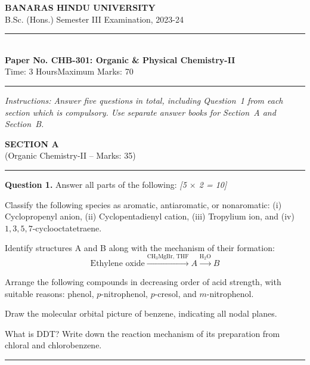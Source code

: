 \documentclass[11pt,a4paper]{article}
\newcommand{\pts}[1]{\hfill   \textit{[#1]}}
\begin{document}
\begin{center}
  {\large\bfseries BANARAS HINDU UNIVERSITY}\\[2pt]
  {\normalsize B.Sc. (Hons.) Semester III Examination, 2023-24}\\[6pt]
  \rule{0.8\linewidth}{0.5pt}\\[6pt]
  {\large\bfseries Paper No. CHB-301: Organic \& Physical Chemistry-II}\\[4pt]
  {\normalsize Time: 3 Hours\hfill Maximum Marks: 70}
\end{center}
\rule{\linewidth}{0.4pt}
\small



\noindent   \textit{Instructions: Answer five questions in total, including Question~1 from each section which is compulsory. Use separate answer books for Section~A and Section~B.}

\normalsize
\bigskip


\begin{center}
  {\large\bfseries SECTION A}\\[2pt]
  {\normalsize (Organic Chemistry-II -- Marks: 35)}
\end{center}
\rule{0.4\linewidth}{0.2pt}
\smallskip




\noindent   \textbf{Question 1.} Answer all parts of the following: \pts{5 $ \times$ 2 = 10}

\begin{parts}
  \item Classify the following species as aromatic, antiaromatic, or nonaromatic: (i) Cyclopropenyl anion, (ii) Cyclopentadienyl cation, (iii) Tropylium ion, and (iv) $1,3,5,7$-cyclooctatetraene.
  \item Identify structures A and B along with the mechanism of their formation:
    \[  \text{Ethylene oxide} \xrightarrow{ \text{CH}_3 \text{MgBr, THF}} A \xrightarrow{ \text{H}_2 \text{O}} B \]
  \item Arrange the following compounds in decreasing order of acid strength, with suitable reasons: phenol, $p$-nitrophenol, $p$-cresol, and $m$-nitrophenol.
  \item Draw the molecular orbital picture of benzene, indicating all nodal planes.
  \item What is DDT? Write down the reaction mechanism of its preparation from chloral and chlorobenzene.
\end{parts}

\medskip\rule{\linewidth}{0.2pt}
\end{document}
